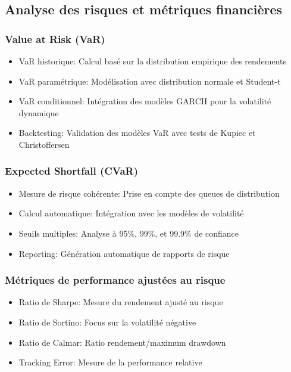 \subsection{Analyse des risques et métriques financières}
\subsubsection{Value at Risk (VaR)}
\begin{itemize}
    \item VaR historique: Calcul basé sur la distribution empirique des rendements
    \item VaR paramétrique: Modélisation avec distribution normale et Student-t
    \item VaR conditionnel: Intégration des modèles GARCH pour la volatilité dynamique
    \item Backtesting: Validation des modèles VaR avec tests de Kupiec et Christoffersen
\end{itemize}

\subsubsection{Expected Shortfall (CVaR)}
\begin{itemize}
    \item Mesure de risque cohérente: Prise en compte des queues de distribution
    \item Calcul automatique: Intégration avec les modèles de volatilité
    \item Seuils multiples: Analyse à 95\%, 99\%, et 99.9\% de confiance
    \item Reporting: Génération automatique de rapports de risque
\end{itemize}

\subsubsection{Métriques de performance ajustées au risque}
\begin{itemize}
    \item Ratio de Sharpe: Mesure du rendement ajusté au risque
    \item Ratio de Sortino: Focus sur la volatilité négative
    \item Ratio de Calmar: Ratio rendement/maximum drawdown
    \item Tracking Error: Mesure de la performance relative
\end{itemize}

